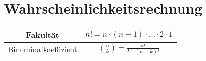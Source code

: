 \documentclass[12pt]{article}
\begin{document}
\section{Wahrscheinlichkeitsrechnung}
\begin{table}[H]
	\centering
	\begin{tabular}{|c|c|}
		\hline
		Fakultät & \(\displaystyle n! = n \cdot (n-1) \cdot \dotsc \cdot 2 \cdot 1 \)\\\hline
		Binominalkoeffizient & \(\displaystyle {n \choose k} = \frac{n!}{k!\cdot(n-k)!}\)\\\hline
	\end{tabular}	
\end{table}
\end{document}
